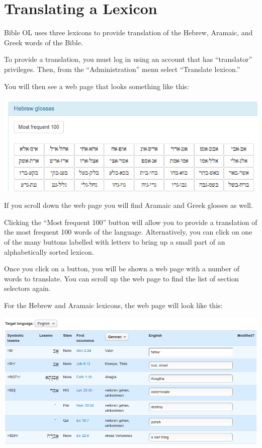 \documentclass[11pt,oneside,a4paper]{memoir}
\begin{document}
\chapter{Translating a Lexicon}

Bible OL uses three lexicons to provide translation of the Hebrew, Aramaic, and Greek words of the
Bible.

To provide a translation, you must log in using an account that has ``translator'' privileges. Then,
from the ``Administration'' menu select ``Translate lexicon.''

You will then see a web page that looks something like this:

\begin{center}
  \includegraphics[width=0.9\linewidth]{lexicon.png}
\end{center}

If you scroll down the web page you will find Aramaic and Greek glosses as well.

Clicking the ``Most frequent 100'' button will allow you to provide a translation of the most
frequent 100 words of the language. Alternatively, you can click on one of the many buttons labelled
with letters to bring up a small part of an alphabetically sorted lexicon.

Once you click on a button, you will be shown a web page with a number of words to translate. You
can scroll up the web page to find the list of section selectors again.

For the Hebrew and Aramaic lexicons, the web page will look like this:

\begin{center}
  \includegraphics[width=0.9\linewidth]{lexiconHeb.png}
\end{center}
\end{document}
